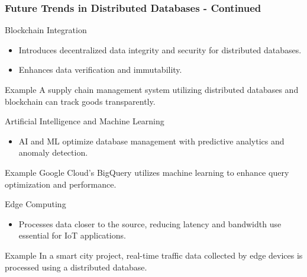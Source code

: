 \documentclass[aspectratio=169]{beamer}
\begin{document}
\begin{frame}[fragile]
  \frametitle{Future Trends in Distributed Databases - Continued}
  \begin{block}{Blockchain Integration}
      \begin{itemize}
          \item Introduces decentralized data integrity and security for distributed databases.
          \item Enhances data verification and immutability.
      \end{itemize}
      \begin{exampleblock}{Example}
          A supply chain management system utilizing distributed databases and blockchain can track goods transparently.
      \end{exampleblock}
  \end{block}

  \begin{block}{Artificial Intelligence and Machine Learning}
      \begin{itemize}
          \item AI and ML optimize database management with predictive analytics and anomaly detection.
      \end{itemize}
      \begin{exampleblock}{Example}
          Google Cloud’s BigQuery utilizes machine learning to enhance query optimization and performance.
      \end{exampleblock}
  \end{block}

  \begin{block}{Edge Computing}
      \begin{itemize}
          \item Processes data closer to the source, reducing latency and bandwidth use essential for IoT applications.
      \end{itemize}
      \begin{exampleblock}{Example}
          In a smart city project, real-time traffic data collected by edge devices is processed using a distributed database.
      \end{exampleblock}
  \end{block}
\end{frame}
\end{document}
